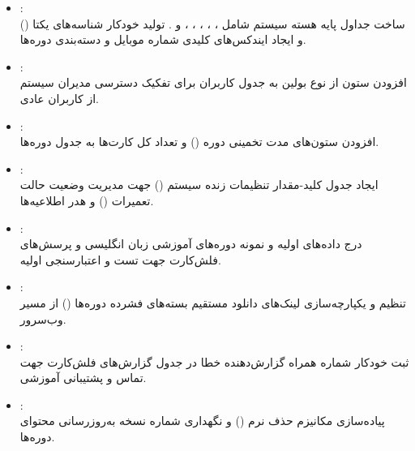 \documentclass[11pt,a4paper]{article}
\begin{document}
\begin{itemize}[leftmargin=0.8cm]
    \item \textbf{}:\\
    ساخت جداول پایه هسته سیستم شامل ، ، ، ، ،  و . تولید خودکار شناسه‌های یکتا () و ایجاد ایندکس‌های کلیدی شماره موبایل و دسته‌بندی دوره‌ها.

    \item \textbf{}:\\
    افزودن ستون  از نوع بولین به جدول کاربران برای تفکیک دسترسی مدیران سیستم از کاربران عادی.

    \item \textbf{}:\\
    افزودن ستون‌های مدت تخمینی دوره () و تعداد کل کارت‌ها به جدول دوره‌ها.

    \item \textbf{}:\\
    ایجاد جدول کلید-مقدار تنظیمات زنده سیستم () جهت مدیریت وضعیت حالت تعمیرات () و هدر اطلاعیه‌ها.

    \item \textbf{}:\\
    درج داده‌های اولیه و نمونه دوره‌های آموزشی زبان انگلیسی و پرسش‌های فلش‌کارت جهت تست و اعتبارسنجی اولیه.

    \item \textbf{}:\\
    تنظیم و یکپارچه‌سازی لینک‌های دانلود مستقیم بسته‌های فشرده دوره‌ها () از مسیر وب‌سرور.

    \item \textbf{}:\\
    ثبت خودکار شماره همراه گزارش‌دهنده خطا در جدول گزارش‌های فلش‌کارت جهت تماس و پشتیبانی آموزشی.

    \item \textbf{}:\\
    پیاده‌سازی مکانیزم حذف نرم () و نگهداری شماره نسخه به‌روزرسانی محتوای دوره‌ها.


\end{itemize}
\end{document}
